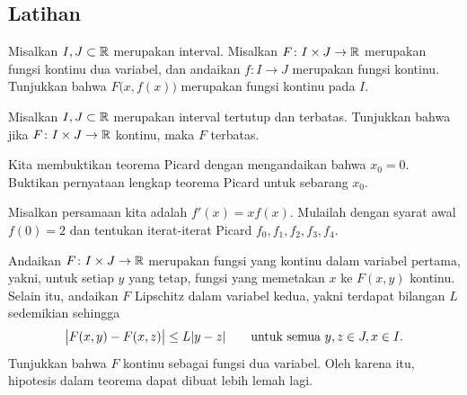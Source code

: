 \subsection{Latihan}

\begin{exercise}
Misalkan $I, J \subset {\mathbb{R}}$ merupakan interval.
Misalkan $F \colon I \times J \to {\mathbb{R}}$ merupakan fungsi kontinu
dua variabel,
dan andaikan $f \colon I \to J$ merupakan fungsi kontinu.
Tunjukkan bahwa $F\bigl(x,f(x)\bigr)$ merupakan fungsi kontinu pada $I$.
\end{exercise}

\begin{exercise}
Misalkan $I, J \subset {\mathbb{R}}$ merupakan interval tertutup dan terbatas.
Tunjukkan bahwa jika $F \colon I \times J \to {\mathbb{R}}$ kontinu,
maka $F$ terbatas.
\end{exercise}

\begin{exercise}
Kita membuktikan teorema Picard dengan mengandaikan bahwa $x_0 = 0$.
Buktikan pernyataan lengkap teorema Picard untuk sebarang $x_0$.
\end{exercise}

\begin{exercise}
Misalkan persamaan kita adalah $f'(x)=x f(x)$.  Mulailah dengan syarat awal
$f(0)=2$ dan tentukan iterat-iterat Picard $f_0,f_1,f_2,f_3,f_4$.
\end{exercise}

\begin{exercise}
Andaikan $F \colon I \times J \to {\mathbb{R}}$
merupakan fungsi yang kontinu dalam variabel pertama,
yakni, untuk setiap $y$ yang tetap, fungsi yang memetakan $x$ ke $F(x,y)$
kontinu.  Selain itu, andaikan $F$ Lipschitz dalam variabel kedua,
yakni terdapat bilangan $L$ sedemikian sehingga
\begin{equation*}
\bigl\lvert {F(x,y) - F(x,z)} \bigr\rvert \leq L \lvert {y-z} \rvert
\qquad \text{untuk semua } y,z \in J, x \in I .
\end{equation*}
Tunjukkan bahwa $F$ kontinu sebagai fungsi dua variabel.  Oleh karena itu,
hipotesis dalam teorema dapat dibuat lebih lemah lagi.
\end{exercise}

